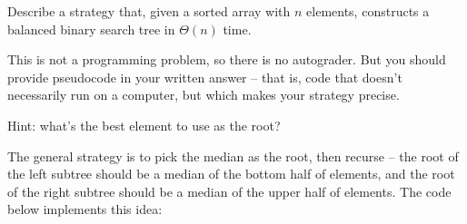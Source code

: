 \begin{prob}

    Describe a strategy that, given a sorted array with $n$ elements,
    constructs a balanced binary search tree in $\Theta(n)$ time. 

    This is not a programming problem, so there is no autograder. But you should
    provide pseudocode in your written answer -- that is, code that doesn't
    necessarily run on a computer, but which makes your strategy precise.

    Hint: what's the best element to use as the root?

    \begin{soln}
        The general strategy is to pick the median as the root, then recurse --
        the root of the left subtree should be a median of the bottom half of
        elements, and the root of the right subtree should be a median of the
        upper half of elements. The code below implements this idea:

        \inputminted{python}{\thisdir/include-solution/soln.py}
    \end{soln}

\end{prob}
